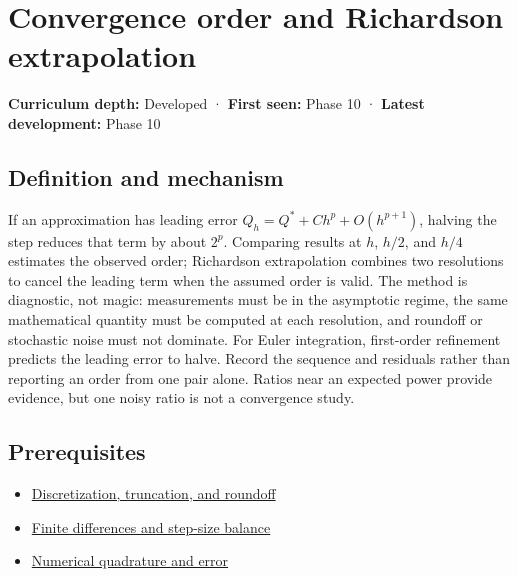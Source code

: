 \hypertarget{appendix-aca80b6bf17a}{}\label{referencestart:appendix-aca80b6bf17a}
\section{Convergence order and Richardson extrapolation}\label{appendix-aca80b6bf17a-convergence-order-and-richardson-extrapolation}

\hypertarget{appendix-aca80b6bf17a-convergence-order-and-richardson-extrapolation}{}

\textbf{Curriculum depth:} Developed · \textbf{First seen:} Phase 10 · \textbf{Latest development:} Phase 10

\begin{allmightroledefinition}

\subsection{Definition and mechanism}\label{appendix-aca80b6bf17a-definition-and-mechanism}

\hypertarget{appendix-aca80b6bf17a-definition-and-mechanism}{}

If an approximation has leading error \(Q_h=Q^*+Ch^p+O(h^{p+1})\), halving the step reduces that term by about \(2^p\). Comparing results at \(h\), \(h/2\), and \(h/4\) estimates the observed order; Richardson extrapolation combines two resolutions to cancel the leading term when the assumed order is valid. The method is diagnostic, not magic: measurements must be in the asymptotic regime, the same mathematical quantity must be computed at each resolution, and roundoff or stochastic noise must not dominate. For Euler integration, first-order refinement predicts the leading error to halve. Record the sequence and residuals rather than reporting an order from one pair alone. Ratios near an expected power provide evidence, but one noisy ratio is not a convergence study.

\end{allmightroledefinition}

\subsection{Prerequisites}\label{appendix-aca80b6bf17a-prerequisites}

\hypertarget{appendix-aca80b6bf17a-prerequisites}{}

\begin{itemize}
\tightlist
\item
  \hyperref[appendix-6b0648b2b8e8]{Discretization, truncation, and roundoff}
\item
  \hyperref[appendix-e2d7b4f2161d]{Finite differences and step-size balance}
\item
  \hyperref[appendix-80521eae6b71]{Numerical quadrature and error}
\end{itemize}

